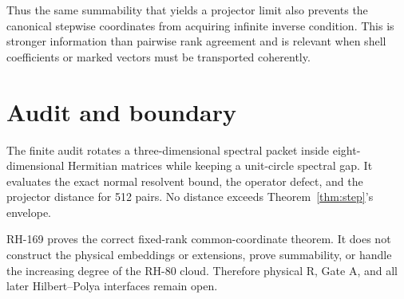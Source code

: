\documentclass[12pt]{article}
\begin{document}
Thus the same summability that yields a projector limit also prevents the
canonical stepwise coordinates from acquiring infinite inverse condition.
This is stronger information than pairwise rank agreement and is relevant
when shell coefficients or marked vectors must be transported coherently.

\section{Audit and boundary}
The finite audit rotates a three-dimensional spectral packet inside eight-
dimensional Hermitian matrices while keeping a unit-circle spectral gap.  It
evaluates the exact normal resolvent bound, the operator defect, and the
projector distance for 512 pairs.  No distance exceeds
Theorem~\ref{thm:step}'s envelope.

RH-169 proves the correct fixed-rank common-coordinate theorem.  It does not
construct the physical embeddings or extensions, prove summability, or
handle the increasing degree of the RH-80 cloud.  Therefore physical R,
Gate A, and all later Hilbert--Polya interfaces remain open.



\end{document}

